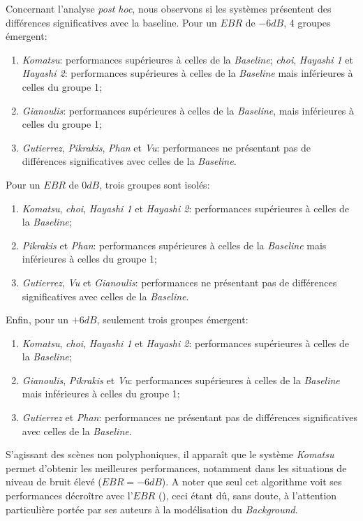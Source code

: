 Concernant l'analyse \emph{post hoc}, nous observons si les systèmes présentent des différences significatives avec la baseline. Pour un $EBR$ de $-6dB$, 4 groupes émergent:

\begin{enumerate}
\item \emph{Komatsu}: performances supérieures à celles de la \emph{Baseline};
\emph{choi}, \emph{Hayashi 1} et \emph{Hayashi 2}: performances supérieures à celles de la \emph{Baseline} mais inférieures à celles du groupe 1;
\item \emph{Gianoulis}: performances supérieures à celles de la \emph{Baseline}, mais inférieures à celles du groupe 1;
\item \emph{Gutierrez}, \emph{Pikrakis}, \emph{Phan} et \emph{Vu}: performances ne présentant pas de différences significatives avec celles de la \emph{Baseline}.
\end{enumerate}

Pour un $EBR$ de $0dB$, trois groupes sont isolés: 

\begin{enumerate}
\item \emph{Komatsu}, \emph{choi}, \emph{Hayashi 1} et \emph{Hayashi 2}: performances supérieures à celles de la \emph{Baseline};
\item \emph{Pikrakis} et \emph{Phan}: performances supérieures à celles de la \emph{Baseline} mais inférieures à celles du groupe 1;
\item \emph{Gutierrez}, \emph{Vu} et \emph{Gianoulis}: performances ne présentant pas de différences significatives avec celles de la \emph{Baseline}.
\end{enumerate}

Enfin, pour un $+6dB$, seulement trois groupes émergent:

\begin{enumerate}
\item \emph{Komatsu}, \emph{choi}, \emph{Hayashi 1} et \emph{Hayashi 2}: performances supérieures à celles de la \emph{Baseline};
\item \emph{Gianoulis}, \emph{Pikrakis} et \emph{Vu}: performances supérieures à celles de la \emph{Baseline} mais inférieures à celles du groupe 1;
\item \emph{Gutierrez} et \emph{Phan}: performances ne présentant pas de différences significatives avec celles de la \emph{Baseline}.
\end{enumerate}

S'agissant des scènes non polyphoniques, il apparaît que le système \emph{Komatsu} permet d'obtenir les meilleures performances, notamment dans les situations de niveau de bruit élevé ($EBR=-6dB$). A noter que seul cet algorithme voit ses performances décroître avec l'$EBR$ (), ceci étant dû, sans doute, à l'attention particulière portée par ses auteurs à la modélisation du \emph{Background}.


